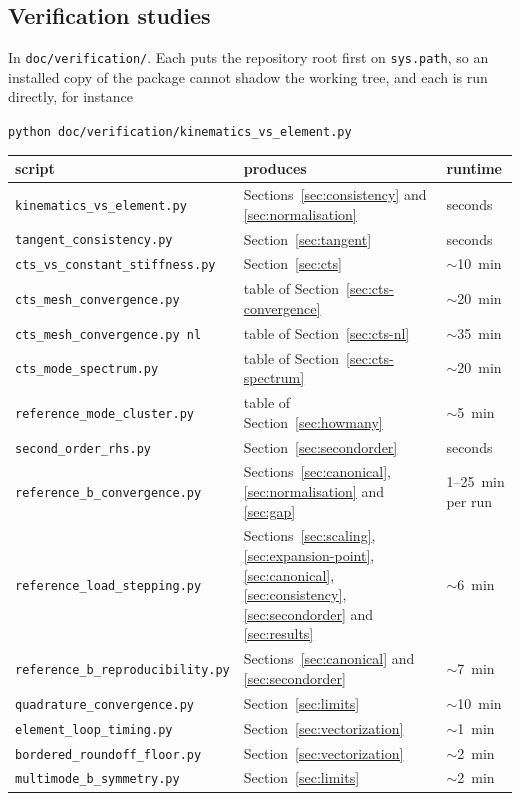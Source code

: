 \documentclass[11pt,a4paper]{article}
\begin{document}
\subsection{Verification studies}
\label{sec:appendix-scripts}

In \texttt{doc/verification/}.  Each puts the repository root first on
\texttt{sys.path}, so an installed copy of the package cannot shadow the
working tree, and each is run directly, for instance
\begin{center}
\texttt{python doc/verification/kinematics\_vs\_element.py}
\end{center}

\begin{center}
\begin{tabular}{lll}
\toprule
script & produces & runtime \\
\midrule
\texttt{kinematics\_vs\_element.py}
  & Sections~\ref{sec:consistency} and \ref{sec:normalisation} & seconds \\
\texttt{tangent\_consistency.py}
  & Section~\ref{sec:tangent} & seconds \\
\texttt{cts\_vs\_constant\_stiffness.py}
  & Section~\ref{sec:cts} & $\sim$10~min \\
\texttt{cts\_mesh\_convergence.py}
  & table of Section~\ref{sec:cts-convergence} & $\sim$20~min \\
\texttt{cts\_mesh\_convergence.py nl}
  & table of Section~\ref{sec:cts-nl} & $\sim$35~min \\
\texttt{cts\_mode\_spectrum.py}
  & table of Section~\ref{sec:cts-spectrum} & $\sim$20~min \\
\texttt{reference\_mode\_cluster.py}
  & table of Section~\ref{sec:howmany} & $\sim$5~min \\
\texttt{second\_order\_rhs.py}
  & Section~\ref{sec:secondorder} & seconds \\
\texttt{reference\_b\_convergence.py}
  & Sections~\ref{sec:canonical}, \ref{sec:normalisation} and \ref{sec:gap}
  & 1--25~min per run \\
\texttt{reference\_load\_stepping.py}
  & Sections~\ref{sec:scaling}, \ref{sec:expansion-point},
    \ref{sec:canonical}, \ref{sec:consistency}, \ref{sec:secondorder} and
    \ref{sec:results} & $\sim$6~min \\
\texttt{reference\_b\_reproducibility.py}
  & Sections~\ref{sec:canonical} and \ref{sec:secondorder} & $\sim$7~min \\
\texttt{quadrature\_convergence.py}
  & Section~\ref{sec:limits} & $\sim$10~min \\
\texttt{element\_loop\_timing.py}
  & Section~\ref{sec:vectorization} & $\sim$1~min \\
\texttt{bordered\_roundoff\_floor.py}
  & Section~\ref{sec:vectorization} & $\sim$2~min \\
\texttt{multimode\_b\_symmetry.py}
  & Section~\ref{sec:limits} & $\sim$2~min \\
\bottomrule
\end{tabular}
\end{center}
\end{document}
